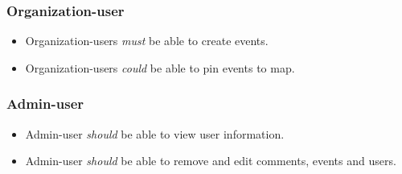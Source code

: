 \documentclass[12pt, oneside]{article}   	%
\begin{document}
\subsubsection*{Organization-user}
\begin{itemize}
\item Organization-users \textit{must} be able to create events.
\item Organization-users \textit{could} be able to pin events to map. 
\end{itemize}

\subsubsection*{Admin-user}
\begin{itemize}
\item Admin-user \textit{should} be able to view user information. 
\item Admin-user \textit{should} be able to remove and edit comments, events and users.
\end{itemize}
\end{document}
